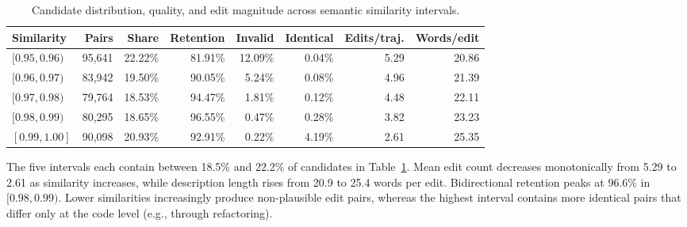 \begin{table}[t]
\centering
\caption{Candidate distribution, quality, and edit magnitude across semantic similarity intervals.}
\label{tab:daeditikz_similarity_summary}
\small
\setlength{\tabcolsep}{5.2pt}
\renewcommand{\arraystretch}{0.98}
\begin{tabular}{lrrrrrrr}
\toprule
\textbf{Similarity} & \textbf{Pairs} & \textbf{Share} & \textbf{Retention}
& \textbf{Invalid} & \textbf{Identical} & \textbf{Edits/traj.} & \textbf{Words/edit} \\
\midrule
$[0.95,0.96)$ & 95,641 & 22.22\% & 81.91\% & 12.09\% & 0.04\% & 5.29 & 20.86 \\
$[0.96,0.97)$ & 83,942 & 19.50\% & 90.05\% &  5.24\% & 0.08\% & 4.96 & 21.39 \\
$[0.97,0.98)$ & 79,764 & 18.53\% & 94.47\% &  1.81\% & 0.12\% & 4.48 & 22.11 \\
$[0.98,0.99)$ & 80,295 & 18.65\% & 96.55\% & 0.47\% & 0.28\% & 3.82 & 23.23 \\
$[0.99,1.00]$ & 90,098 & 20.93\% & 92.91\% &  0.22\% & 4.19\% & 2.61 & 25.35 \\
\bottomrule
\end{tabular}
\end{table}
The five intervals each contain between 18.5\% and 22.2\% of candidates in Table~\ref{tab:daeditikz_similarity_summary}. Mean edit count decreases monotonically from 5.29 to 2.61 as similarity increases, while description length rises from 20.9 to 25.4 words per edit. Bidirectional retention peaks at 96.6\% in $[0.98,0.99)$. Lower similarities increasingly produce non-plausible edit pairs, whereas the highest interval contains more identical pairs that differ only at the code level (e.g., through refactoring).

\clearpage

